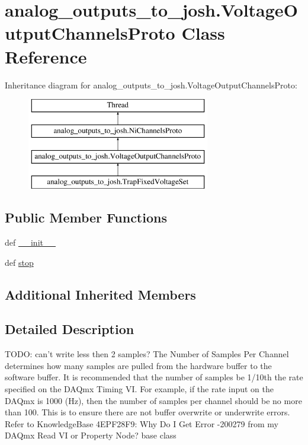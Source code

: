 \hypertarget{classanalog__outputs__to__josh_1_1_voltage_output_channels_proto}{\section{analog\-\_\-outputs\-\_\-to\-\_\-josh.\-Voltage\-Output\-Channels\-Proto Class Reference}
\label{classanalog__outputs__to__josh_1_1_voltage_output_channels_proto}
}
Inheritance diagram for analog\-\_\-outputs\-\_\-to\-\_\-josh.\-Voltage\-Output\-Channels\-Proto\-:\begin{figure}[H]
\begin{center}
\leavevmode
\includegraphics[height=4.000000cm]{classanalog__outputs__to__josh_1_1_voltage_output_channels_proto}
\end{center}
\end{figure}
\subsection*{Public Member Functions}
\begin{DoxyCompactItemize}
\item 
def \hyperlink{classanalog__outputs__to__josh_1_1_voltage_output_channels_proto_a75bb5457f0f5698c8cb368e143e89978}{\-\_\-\-\_\-init\-\_\-\-\_\-}
\item 
def \hyperlink{classanalog__outputs__to__josh_1_1_voltage_output_channels_proto_aba4f449380f46cabc431bb770695e05c}{stop}
\end{DoxyCompactItemize}
\subsection*{Additional Inherited Members}


\subsection{Detailed Description}
\begin{DoxyVerb}TODO: can't write less then 2 samples?
The Number of Samples Per Channel determines how many samples are pulled from the hardware buffer to the software buffer.
It is recommended that the number of samples be 1/10th the rate specified on the DAQmx Timing VI.
For example, if the rate input on the DAQmx is 1000 (Hz), then the number of samples per channel should be no more than 100.
This is to ensure there are not buffer overwrite or underwrite errors.  Refer to KnowledgeBase 4EPF28F9: Why Do I Get Error
-200279 from my DAQmx Read VI or Property Node?
base class
\end{DoxyVerb}
 

